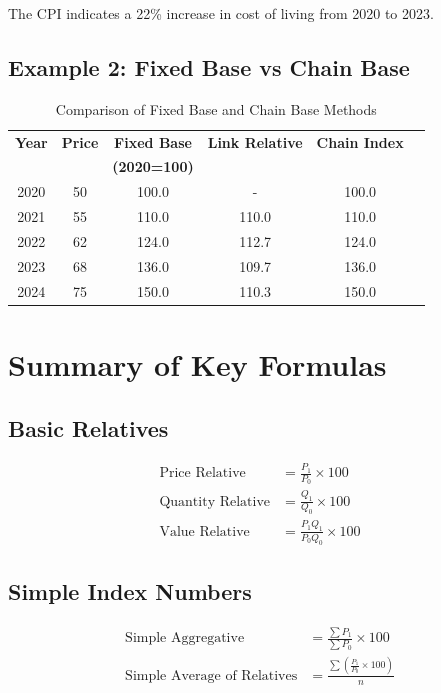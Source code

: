 \documentclass[twoside]{book}
\begin{document}
The CPI indicates a 22\% increase in cost of living from 2020 to 2023.

\subsection{Example 2: Fixed Base vs Chain Base}

\begin{table}[h]
\centering
\caption{Comparison of Fixed Base and Chain Base Methods}
\begin{tabular}{cccccc}
\toprule
\textbf{Year} & \textbf{Price} & \textbf{Fixed Base} & \textbf{Link Relative} & \textbf{Chain Index} \\
 & & \textbf{(2020=100)} & & \\
\midrule
2020 & 50 & 100.0 & - & 100.0 \\
2021 & 55 & 110.0 & 110.0 & 110.0 \\
2022 & 62 & 124.0 & 112.7 & 124.0 \\
2023 & 68 & 136.0 & 109.7 & 136.0 \\
2024 & 75 & 150.0 & 110.3 & 150.0 \\
\bottomrule
\end{tabular}
\end{table}

\section{Summary of Key Formulas}

\subsection{Basic Relatives}
\begin{align}
\text{Price Relative} &= \frac{P_1}{P_0} \times 100 \\
\text{Quantity Relative} &= \frac{Q_1}{Q_0} \times 100 \\
\text{Value Relative} &= \frac{P_1 Q_1}{P_0 Q_0} \times 100
\end{align}

\subsection{Simple Index Numbers}
\begin{align}
\text{Simple Aggregative} &= \frac{\sum P_1}{\sum P_0} \times 100 \\
\text{Simple Average of Relatives} &= \frac{\sum \left(\frac{P_1}{P_0} \times 100\right)}{n}
\end{align}
\end{document}
